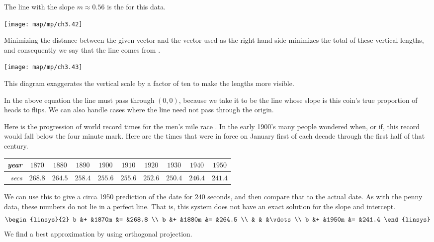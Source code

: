 The line with the slope \( m\approx 0.56 \)
is the %
for this data.
\begin{center}  \small
  \texttt{[image: map/mp/ch3.42]}
\end{center}
Minimizing the distance
between the given vector and the vector used as the right-hand side
minimizes the total of these vertical lengths,
and consequently
we say that the line comes from
.
\begin{center}  \small
  \texttt{[image: map/mp/ch3.43]}
\end{center}
This diagram exaggerates the vertical scale by a factor of ten
to make the lengths more visible.

In the above equation the line 
must pass through \( (0,0) \),
because we take it to be
the line whose slope is this coin's true proportion
of heads to flips. 
We can also handle cases where the line need not
pass through the origin.

Here is
the progression of world record times for the men's mile race \cite{Oakley}.
In the early 1900's many people wondered when, or if, 
this record would fall below the four minute mark.
Here are the times that were in force on January first
of each decade through the first half of that century.
\begin{center} \small
  \begin{tabular}{r|ccccccccc}
    \textit{year} &$1870$ &$1880$ &$1890$  &$1900$  
        &$1910$  &$1920$  &$1930$ &$1940$ &$1950$   \\
    \hline
    \textit{secs}  &$268.8$  &$264.5$  &$258.4$  &$255.6$  
        &$255.6$  &$252.6$  &$250.4$ &$246.4$ &$241.4$
  \end{tabular}  
\end{center}
We can use this to give a circa 1950 prediction of the date for $240$ seconds, 
and then compare that to the actual date.
As with the penny data, these numbers do not lie in a perfect line.
That is, this system does not have an exact solution for the slope
and intercept.
\begin{equation*}
  \begin{linsys}{2}
    b &+  &1870m  &=  &268.8 \\ 
    b &+  &1880m  &=  &264.5 \\ 
      &   &       &\vdots     \\
    b &+  &1950m  &=  &241.4  
  \end{linsys}
\end{equation*}
We find a best approximation by using orthogonal projection.


